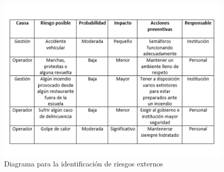     \begin{figure}[H]
        \centering
        \includegraphics[scale=0.25]{30/img/Posibles riesgos ext.pdf}
        \caption{Diagrama para la identificación de riesgos externos}
    \end{figure}
